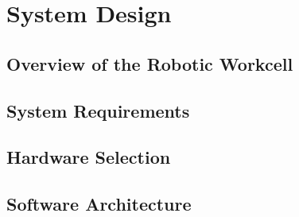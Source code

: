 \chapter{System Design}
\label{chap:design}

\setcounter{section}{0}
\setcounter{subsection}{0}

\section{Overview of the Robotic Workcell}


\section{System Requirements}


\section{Hardware Selection}


\section{Software Architecture}



